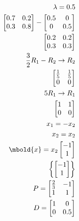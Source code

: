 \documentclass[12pt letter]{report}
\begin{document}
{  \begin{align*}
    \lambda = 0.5                                                                                            \\
    \begin{bmatrix} 0.7 & 0.2 \\ 0.3 & 0.8 \end{bmatrix} - \begin{bmatrix} 0.5 & 0 \\ 0 & 0.5  \end{bmatrix} \\
    \begin{bmatrix}
      0.2 & 0.2 \\
      0.3 & 0.3
    \end{bmatrix}                                                                                           \\
    \frac{3}{2}R_1 - R_2  \rightarrow R_2                                                                    \\
    \begin{bmatrix}
      \frac{1}{5} & \frac{1}{5} \\
      0           & 0           \\
    \end{bmatrix}
    \\
    5R_1 \to R_1                                                                                             \\
    \begin{bmatrix}
      1 & 1 \\
      0 & 0 \\
    \end{bmatrix}
    \\
    x_1 = -x_2                                                                                               \\
    x_2 = x_2                                                                                                \\
    \mbold{x} = x_2 \begin{bmatrix} -1 \\ 1 \end{bmatrix}                                                    \\
    \left\{ \begin{bmatrix} -1 \\ 1 \end{bmatrix} \right\}                                                   \\
    P = \begin{bmatrix} \frac{2}{3} & -1 \\ 1 & 1 \end{bmatrix}                                              \\
    D = \begin{bmatrix} 1 & 0 \\ 0 & 0.5 \end{bmatrix}
  \end{align*}

}
\end{document}

